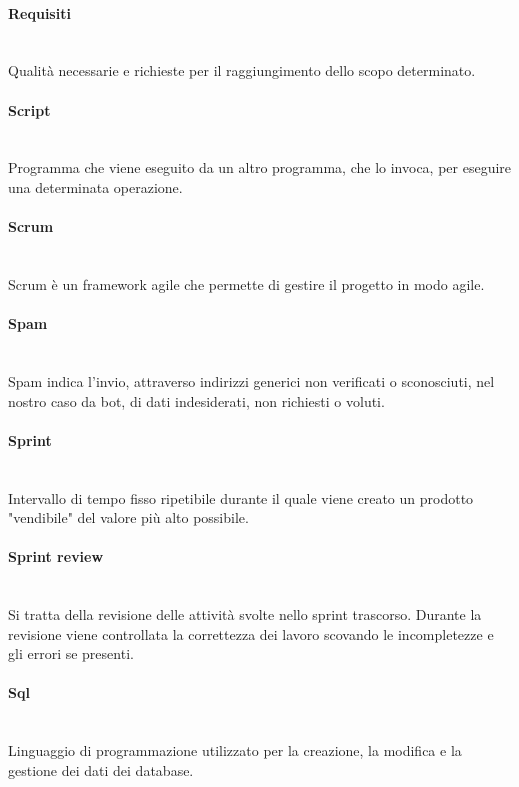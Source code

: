 \paragraph{Requisiti}~\smallskip \\
Qualità necessarie e richieste per il raggiungimento dello scopo determinato.

\paragraph{Script}~\smallskip \\
Programma che viene eseguito da un altro programma, che lo invoca, per eseguire una determinata operazione.

\paragraph{Scrum}~\smallskip \\
Scrum è un framework agile che permette di gestire il progetto in modo agile.

\paragraph{Spam}~\smallskip \\
Spam indica l'invio, attraverso indirizzi generici non verificati o sconosciuti, nel nostro caso da bot, di dati indesiderati, non richiesti o voluti.

\paragraph{Sprint}~\smallskip \\
Intervallo di tempo fisso ripetibile durante il quale viene creato un prodotto "vendibile" del valore più alto possibile.

\paragraph{Sprint review}~\smallskip \\
Si tratta della revisione delle attività svolte nello sprint trascorso. Durante la revisione viene controllata la correttezza
dei lavoro scovando le incompletezze e gli errori se presenti.

\paragraph{Sql}~\smallskip \\
Linguaggio di programmazione utilizzato per la creazione, la modifica e la gestione dei dati dei database.

